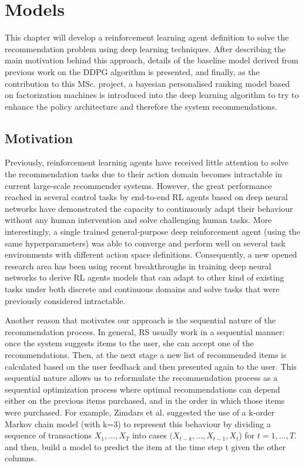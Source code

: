 \chapter{Models}
\label{sec:chapterlabel3}

This chapter will develop a reinforcement learning agent definition to solve the recommendation problem using deep learning techniques. After describing the main motivation behind this approach, details of the baseline model derived from previous work on the DDPG algorithm is presented, and finally, as the contribution to this MSc. project, a bayesian personalised ranking model based on factorization machines is introduced into the deep learning algorithm to try to enhance the policy architecture and therefore the system recommendations.

\section{Motivation}

Previously, reinforcement learning agents have received little attention to solve the recommendation tasks due to their action domain becomes intractable in current large-scale recommender systems. However, the great performance reached in several control tasks by end-to-end RL agents based on deep neural networks \cite{mnih2015human} have demonstrated the capacity to continuously adapt their behaviour without any human intervention and solve challenging human tasks. More interestingly, a single trained general-purpose deep reinforcement agent (using the same hyperparameters) was able to converge and perform well on several task environments with different action space definitions. Consequently, a new opened research area has been using recent breakthroughs in training deep neural networks to derive RL agents models that can adapt to other kind of existing tasks under both discrete and continuous domains and solve tasks that were previously considered intractable.

Another reason that motivates our approach is the sequential nature of the recommendation process. In general, RS usually work in a sequential manner: once the system suggests items to the user, she can accept one of the recommendations. Then, at the next stage a new list of recommended items is calculated based on the user feedback and then presented again to the user. This sequential nature allows us to reformulate the recommendation process as a sequential optimization process where optimal recommendations can depend either on the previous items purchased, and in the order in which those items were purchased. For example, Zimdars et al. \cite{zimdars2001using} suggested the use of a k-order Markov chain model (with k=3) to represent this behaviour by dividing a sequence of transactions $X_1, . . . ,X_T$ into cases $(X_{t-k}, . . . ,X_{t-1},X_t$) for $t = 1, . . . ,T$. and then, build a model to predict the item at the time step t given the other columns. 

